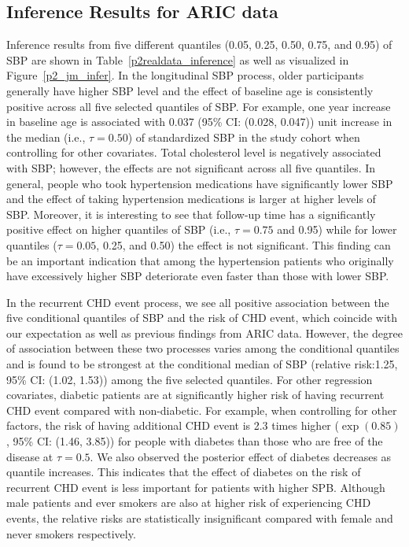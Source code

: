 \subsection{Inference Results for ARIC data}\label{sec:p2data_results}
Inference results from five different quantiles (0.05, 0.25, 0.50, 0.75, and 0.95) of SBP are shown in Table~\ref{p2realdata_inference} as well as visualized in Figure~\ref{p2_jm_infer}. In the longitudinal SBP process, older participants generally have higher SBP level and the effect of baseline age is consistently positive across all five selected quantiles of SBP. For example, one year increase in baseline age is associated with 0.037 (95\% CI: (0.028, 0.047)) unit increase in the median (i.e., $\tau=0.50$) of standardized SBP in the study cohort when controlling for other covariates. Total cholesterol level is negatively associated with SBP; however, the effects are not significant across all five quantiles. In general, people who took hypertension medications have significantly lower SBP and the effect of taking hypertension medications is larger at higher levels of SBP. Moreover, it is interesting to see that follow-up time has a significantly positive effect on higher quantiles of SBP (i.e., $\tau=0.75$ and 0.95) while for lower quantiles ($\tau=0.05$, 0.25, and 0.50) the effect is not significant. This finding can be an important indication that among the hypertension patients who originally have excessively higher SBP deteriorate even faster than those with lower SBP.

In the recurrent CHD event process, we see all positive association between the five conditional quantiles of SBP and the risk of CHD event, which coincide with our expectation as well as previous findings from ARIC data. However, the degree of association between these two processes varies among the conditional quantiles and is found to be strongest at the conditional median of SBP (relative risk:1.25, 95\% CI: (1.02, 1.53)) among the five selected quantiles. For other regression covariates, diabetic patients are at significantly higher risk of having recurrent CHD event compared with non-diabetic. For example, when controlling for other factors, the risk of having additional CHD event is 2.3 times higher ($\exp(0.85)$, 95\% CI: (1.46, 3.85)) for people with diabetes than those who are free of the disease at $\tau=0.5$. We also observed the posterior effect of diabetes decreases as quantile increases. This indicates that the effect of diabetes on the risk of recurrent CHD event is less important for patients with higher SPB. Although  male patients and ever smokers are also at higher risk of experiencing CHD events, the relative risks are statistically insignificant compared with female and never smokers respectively.

